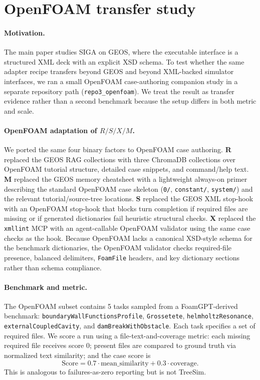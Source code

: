 \documentclass{article}
\begin{document}
\section{OpenFOAM transfer study}
\label{app:openfoam-transfer}

\paragraph{Motivation.}
The main paper studies SIGA on GEOS, where the executable interface is a structured XML deck with an explicit XSD schema. To test whether the same adapter recipe transfers beyond GEOS and beyond XML-backed simulator interfaces, we ran a small OpenFOAM case-authoring companion study in a separate repository path (\texttt{repo3\_openfoam}). We treat the result as transfer evidence rather than a second benchmark because the setup differs in both metric and scale.

\paragraph{OpenFOAM adaptation of \texorpdfstring{$R/S/X/M$}{R/S/X/M}.}
We ported the same four binary factors to OpenFOAM case authoring. \textbf{R} replaced the GEOS RAG collections with three ChromaDB collections over OpenFOAM tutorial structure, detailed case snippets, and command/help text. \textbf{M} replaced the GEOS memory cheatsheet with a lightweight always-on primer describing the standard OpenFOAM case skeleton (\texttt{0/}, \texttt{constant/}, \texttt{system/}) and the relevant tutorial/source-tree locations. \textbf{S} replaced the GEOS XML stop-hook with an OpenFOAM stop-hook that blocks turn completion if required files are missing or if generated dictionaries fail heuristic structural checks. \textbf{X} replaced the \texttt{xmllint} MCP with an agent-callable OpenFOAM validator using the same case checks as the hook. Because OpenFOAM lacks a canonical XSD-style schema for the benchmark dictionaries, the OpenFOAM validator checks required-file presence, balanced delimiters, \texttt{FoamFile} headers, and key dictionary sections rather than schema compliance.

\paragraph{Benchmark and metric.}
The OpenFOAM subset contains 5 tasks sampled from a FoamGPT-derived benchmark: \texttt{boundaryWallFunctionsProfile}, \texttt{Grossetete}, \texttt{helmholtzResonance}, \texttt{externalCoupledCavity}, and \texttt{damBreakWithObstacle}. Each task specifies a set of required files. We score a run using a file-text-and-coverage metric: each missing required file receives score 0; present files are compared to ground truth via normalized text similarity; and the case score is
\[
\mathrm{Score} = 0.7 \cdot \mathrm{mean\_similarity} + 0.3 \cdot \mathrm{coverage}.
\]
This is analogous to failures-as-zero reporting but is not TreeSim.
\end{document}
